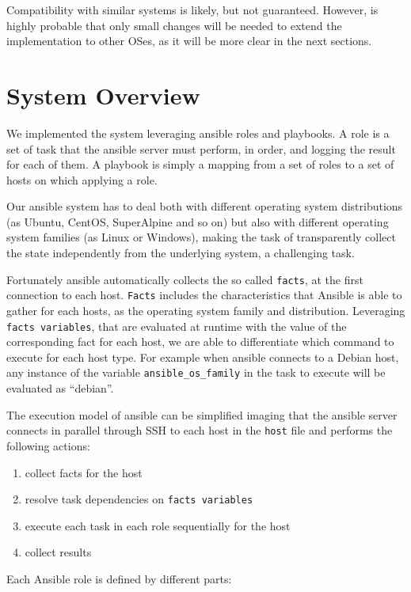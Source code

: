 \documentclass[11pt]{article}
\begin{document}
Compatibility with similar systems is likely, but not guaranteed. However, is highly probable that only small changes will be needed to extend the implementation to other OSes, as it will be more clear in the next sections. 

\section{System Overview} 

We implemented the system leveraging ansible roles and playbooks. A role is a set of task that the ansible server must perform, in order, and logging the result for each of them.  A playbook is simply a mapping from a set of roles to a set of hosts on which applying a role. 

\bigskip
Our ansible system has to deal both with different operating system distributions (as Ubuntu, CentOS, SuperAlpine and so on) but also with different operating system families (as Linux or Windows), making the task of transparently collect the state independently from the underlying system, a challenging task. 

Fortunately ansible automatically collects the so called {\tt facts}, at the first connection to each host. {\tt Facts} includes the characteristics that Ansible is able to gather for each hosts, as the operating system family and distribution. Leveraging {\tt facts variables}, that are evaluated at runtime with the value of the corresponding fact for each host, we are able to differentiate which command to execute for each host type. For example when ansible connects to a Debian host, any instance of the variable {\tt ansible\_os\_family} in the task to execute will be evaluated as ``debian''.

\bigskip
The execution model of ansible can be simplified imaging that the ansible server connects in parallel through SSH to each host in the {\tt host} file and performs the following actions:

\begin{enumerate}
\item collect facts for the host
\item resolve task dependencies on {\tt facts variables}
\item execute each task in each role sequentially for the host
\item collect results
\end{enumerate}

\bigskip
Each Ansible role is defined by different parts:
\end{document}
